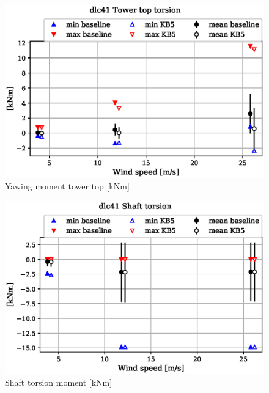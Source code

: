 \begin{figure}[!ht]
\begin{center}
	\includegraphics[width=.85\linewidth]{figures/baseline-vs-KB6/dlc41/tower-tower-node-004-momentvec-z_AA0008_AA0008.eps}
\end{center}
\caption{Yawing moment tower top [kNm]}
\label{fig:baseline-vs-KB6:dlc41:tower-top-yaw}
\end{figure}

\begin{figure}[!ht]
\begin{center}
	\includegraphics[width=.85\linewidth]{figures/baseline-vs-KB6/dlc41/shaft-shaft-node-001-momentvec-z_AA0008_AA0008.eps}
\end{center}
\caption{Shaft torsion moment [kNm]}
\label{fig:baseline-vs-KB6:dlc41:shaft-torsion}
\end{figure}

